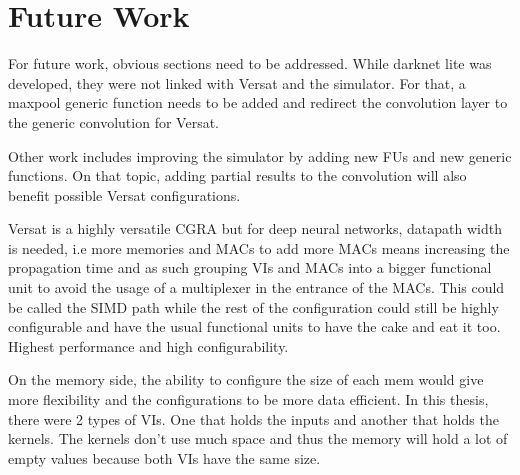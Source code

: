 \section{Future Work}
\label{section:future}

For future work, obvious sections need to be addressed. While darknet lite was developed,
they were not linked with Versat and the simulator. For that, a maxpool generic function
needs to be added and redirect the convolution layer to the generic convolution for Versat.

Other work includes improving the simulator by adding new FUs and new generic functions. On that
topic, adding partial results to the convolution will also benefit possible Versat configurations.

Versat is a highly versatile CGRA but for deep neural networks, datapath width is needed, i.e
more memories and MACs to add more MACs means increasing the propagation time and as such
grouping VIs and MACs into a bigger functional unit to avoid the usage of a multiplexer
in the entrance of the MACs. This could be called the SIMD path while the rest of the configuration
could still be highly configurable and have the usual functional units to have the cake and eat it too.
Highest performance and high configurability.

On the memory side, the ability to configure the size of each mem would give more flexibility
and the configurations to be more data efficient. In this thesis, there were 2 types of VIs. One
that holds the inputs and another that holds the kernels. The kernels don't use much space and thus
the memory will hold a lot of empty values because both VIs have the same size.



